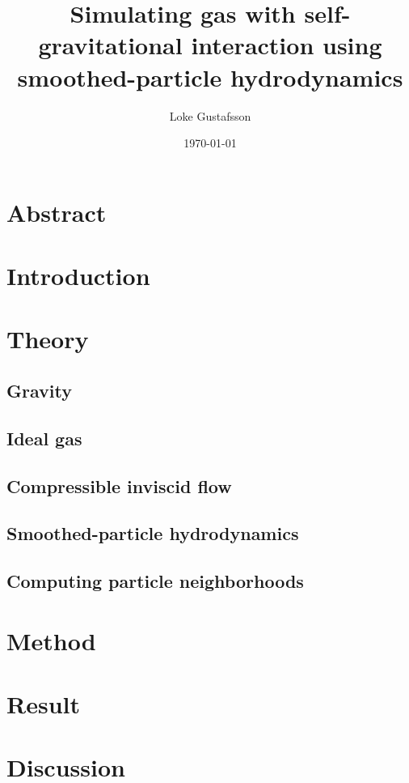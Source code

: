 \documentclass{report}
\title{Simulating gas with self-gravitational interaction using smoothed-particle hydrodynamics}
\subtitle{}
\author{Loke Gustafsson}
\date{\today}
\begin{document}


\chapter*{Abstract}
    

\tableofcontents

\chapter{Introduction}
    

\chapter{Theory}
    \section{Gravity}
    

    \section{Ideal gas}
    

    \section{Compressible inviscid flow}
    

    \section{Smoothed-particle hydrodynamics}
    

    \section{Computing particle neighborhoods}
    

\chapter{Method}
    

\chapter{Result}
    

\chapter{Discussion}
    

\printbibliography[heading=bibintoc,title={References}]
\end{document}
